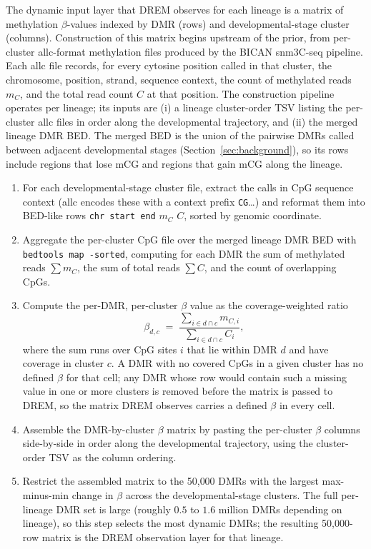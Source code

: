 \documentclass[sigconf,nonacm]{acmart}
\begin{document}
The dynamic input layer that DREM observes for each lineage is a
matrix of methylation $\beta$-values indexed by DMR (rows) and
developmental-stage cluster (columns). Construction of this matrix
begins upstream of the prior, from per-cluster allc-format
methylation files produced by the BICAN snm3C-seq pipeline. Each
allc file records, for every cytosine position called in that
cluster, the chromosome, position, strand, sequence context, the
count of methylated reads $m_C$, and the total read count $C$ at
that position. The construction pipeline operates per lineage; its
inputs are (i) a lineage cluster-order TSV listing the per-cluster
allc files in order along the developmental trajectory, and (ii)
the merged lineage DMR BED. The merged BED is the union of the
pairwise DMRs called between adjacent developmental stages
(Section~\ref{sec:background}), so its rows include regions that
lose mCG and regions that gain mCG along the lineage.

\begin{enumerate}
  \item For each developmental-stage cluster file, extract the calls
        in CpG sequence context (allc encodes these with a context
        prefix \texttt{CG}\dots) and reformat them into BED-like rows
        \texttt{chr start end} $m_C$ $C$, sorted by genomic
        coordinate.
  \item Aggregate the per-cluster CpG file over the merged lineage
        DMR BED with \texttt{bedtools map -sorted}, computing
        for each DMR the sum of methylated reads $\sum m_{C}$, the
        sum of total reads $\sum C$, and the count of overlapping
        CpGs.
  \item Compute the per-DMR, per-cluster $\beta$ value as the
        coverage-weighted ratio
        \[
          \beta_{d,c} \;=\;
            \frac{\sum_{i \in d \cap c} m_{C,i}}
                 {\sum_{i \in d \cap c} C_{i}},
        \]
        where the sum runs over CpG sites $i$ that lie within DMR
        $d$ and have coverage in cluster $c$. A DMR with no covered
        CpGs in a given cluster has no defined $\beta$ for that cell;
        any DMR whose row would contain such a missing value in one
        or more clusters is removed before the matrix is passed to
        DREM, so the matrix DREM observes carries a defined $\beta$
        in every cell.
  \item Assemble the DMR-by-cluster $\beta$ matrix by pasting the
        per-cluster $\beta$ columns side-by-side in order along the
        developmental trajectory, using the cluster-order TSV as the
        column ordering.
  \item Restrict the assembled matrix to the 50{,}000 DMRs with the
        largest max-minus-min change in $\beta$ across the
        developmental-stage clusters. The full per-lineage DMR set
        is large (roughly $0.5$ to $1.6$ million DMRs depending on
        lineage), so this step selects the most dynamic DMRs;
        the resulting 50{,}000-row matrix is the DREM observation
        layer for that lineage.
\end{enumerate}
\end{document}
